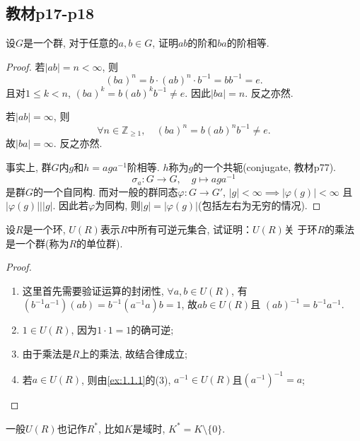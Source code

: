 \subsection{教材p17-p18}

\begin{problem}\label{ex:1.3.1}
    设$G$是一个群, 对于任意的$a, b \in G$, 证明$ab$的阶和$ba$的阶相等.
\end{problem}

\begin{proof}
    若$|ab| = n < \infty$, 则
\[
    (ba)^n = b \cdot (ab)^n \cdot b^{-1} = bb^{-1} = e.
\] 
    且对$1 \leqslant k < n$, $(ba)^k = b(ab)^kb^{-1} \neq e$.
因此$|ba| = n$. 反之亦然.
    
    若$|ab| = \infty$, 则
\[
    \forall n \in \mathbb{Z}_{\geqslant 1}, \quad (ba)^n = b(ab)^nb^{-1} \neq e.
\]
    故$|ba| = \infty$. 反之亦然.

    事实上, 群$G$内$g$和$h = aga^{-1}$阶相等. $h$称为$g$的一个共轭(conjugate, 教材p77).
\[
    \sigma_a: G \to G, \quad g \mapsto aga^{-1}
\]
是群$G$的一个自同构. 而对一般的群同态$\varphi: G \to G'$, $|g| < \infty \implies |\varphi(g)| < \infty$
且$|\varphi(g)| \Big| |g|$. 因此若$\varphi$为同构, 则$|g| = |\varphi(g)|$(包括左右为无穷的情况).
\end{proof}

\begin{problem}\label{ex:1.3.2}
    设$R$是一个环, $U(R)$表示$R$中所有可逆元集合, 试证明：$U(R)$关
于环$R$的乘法是一个群(称为$R$的单位群).
\end{problem}

\begin{proof}
    \begin{enumerate}[(1)]
        \item 这里首先需要验证运算的封闭性, $\forall a, b \in U(R)$, 有
    $(b^{-1}a^{-1})(ab) = b^{-1}(a^{-1}a)b = 1$, 故$ab \in U(R)$且
    $(ab)^{-1} = b^{-1}a^{-1}$.
        \item $1 \in U(R)$, 因为$1 \cdot 1 = 1$的确可逆;
        \item 由于乘法是$R$上的乘法, 故结合律成立;
        \item 若$a \in U(R)$, 则由\ref{ex:1.1.1}的(3), $a^{-1} \in U(R)$且$(a^{-1})^{-1} = a$;
    \end{enumerate}
\end{proof}

\begin{remark}
    一般$U(R)$也记作$R^*$, 比如$K$是域时, $K^* = K \setminus \{0\}$.
\end{remark}

